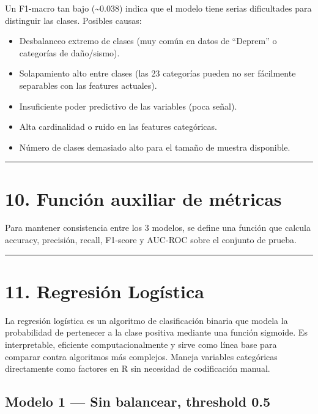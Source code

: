 \documentclass[
]{article}
\providecommand{\tightlist}{%
  \setlength{\itemsep}{0pt}\setlength{\parskip}{0pt}}
\begin{document}
Un F1-macro tan bajo (\textasciitilde0.038) indica que el modelo tiene
serias dificultades para distinguir las clases. Posibles causas:

\begin{itemize}
\tightlist
\item
  Desbalanceo extremo de clases (muy común en datos de ``Deprem'' o
  categorías de daño/sismo).
\item
  Solapamiento alto entre clases (las 23 categorías pueden no ser
  fácilmente separables con las features actuales).
\item
  Insuficiente poder predictivo de las variables (poca señal).
\item
  Alta cardinalidad o ruido en las features categóricas.
\item
  Número de clases demasiado alto para el tamaño de muestra disponible.
\end{itemize}

\begin{center}\rule{0.5\linewidth}{0.5pt}\end{center}

\section{10. Función auxiliar de
métricas}\label{funciuxf3n-auxiliar-de-muxe9tricas}

Para mantener consistencia entre los 3 modelos, se define una función
que calcula accuracy, precisión, recall, F1-score y AUC-ROC sobre el
conjunto de prueba.

\begin{center}\rule{0.5\linewidth}{0.5pt}\end{center}

\section{11. Regresión Logística}\label{regresiuxf3n-loguxedstica}

La regresión logística es un algoritmo de clasificación binaria que
modela la probabilidad de pertenecer a la clase positiva mediante una
función sigmoide. Es interpretable, eficiente computacionalmente y sirve
como línea base para comparar contra algoritmos más complejos. Maneja
variables categóricas directamente como factores en R sin necesidad de
codificación manual.

\subsection{Modelo 1 --- Sin balancear, threshold
0.5}\label{modelo-1-sin-balancear-threshold-0.5}
\end{document}
